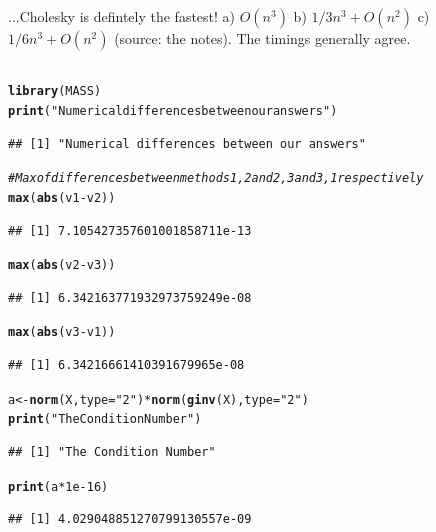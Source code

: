 \documentclass{article}\usepackage[]{graphicx}\usepackage[]{color}
\makeatletter
\newcommand{\hlnum}[1]{\textcolor[rgb]{0.686,0.059,0.569}{#1}}%
\newcommand{\hlstr}[1]{\textcolor[rgb]{0.192,0.494,0.8}{#1}}%
\newcommand{\hlcom}[1]{\textcolor[rgb]{0.678,0.584,0.686}{\textit{#1}}}%
\newcommand{\hlopt}[1]{\textcolor[rgb]{0,0,0}{#1}}%
\newcommand{\hlstd}[1]{\textcolor[rgb]{0.345,0.345,0.345}{#1}}%
\newcommand{\hlkwb}[1]{\textcolor[rgb]{0.69,0.353,0.396}{#1}}%
\newcommand{\hlkwc}[1]{\textcolor[rgb]{0.333,0.667,0.333}{#1}}%
\newcommand{\hlkwd}[1]{\textcolor[rgb]{0.737,0.353,0.396}{\textbf{#1}}}%
\newenvironment{kframe}{%
 \def\at@end@of@kframe{}%
 \ifinner\ifhmode%
  \def\at@end@of@kframe{\end{minipage}}%
  \begin{minipage}{\columnwidth}%
 \fi\fi%
 \def\FrameCommand##1{\hskip\@totalleftmargin \hskip-\fboxsep
 \colorbox{shadecolor}{##1}\hskip-\fboxsep
     \hskip-\linewidth \hskip-\@totalleftmargin \hskip\columnwidth}%
 \MakeFramed {\advance\hsize-\width
   \@totalleftmargin\z@ \linewidth\hsize
   \@setminipage}}%
 {\par\unskip\endMakeFramed%
 \at@end@of@kframe}
\newenvironment{knitrout}{}{} %
\makeatother
\begin{document}
...Cholesky is defintely the fastest!  a) \(O(n^3)\) b) \( 1/3 n^3 + O(n^2) \) c) \(1/6 n^3 + O(n^2) \)  (source: the notes).  The timings generally agree.

\subsection{}

\begin{knitrout}
\color{fgcolor}\begin{kframe}
\begin{alltt}
\hlkwd{library}\hlstd{(MASS)}
\hlkwd{print}\hlstd{(}\hlstr{"Numerical differences between our answers"}\hlstd{)}
\end{alltt}
\begin{verbatim}
## [1] "Numerical differences between our answers"
\end{verbatim}
\begin{alltt}
\hlcom{# Max of differences between methods 1, 2 and 2, 3 and 3, 1 respectively}
\hlkwd{max}\hlstd{(}\hlkwd{abs}\hlstd{(v1}\hlopt{-}\hlstd{v2))}
\end{alltt}
\begin{verbatim}
## [1] 7.105427357601001858711e-13
\end{verbatim}
\begin{alltt}
\hlkwd{max}\hlstd{(}\hlkwd{abs}\hlstd{(v2}\hlopt{-}\hlstd{v3))}
\end{alltt}
\begin{verbatim}
## [1] 6.342163771932973759249e-08
\end{verbatim}
\begin{alltt}
\hlkwd{max}\hlstd{(}\hlkwd{abs}\hlstd{(v3}\hlopt{-}\hlstd{v1))}
\end{alltt}
\begin{verbatim}
## [1] 6.34216661410391679965e-08
\end{verbatim}
\begin{alltt}
\hlstd{a} \hlkwb{<-} \hlkwd{norm}\hlstd{(X,}\hlkwc{type}\hlstd{=}\hlstr{"2"}\hlstd{)} \hlopt{*} \hlkwd{norm}\hlstd{(}\hlkwd{ginv}\hlstd{(X),}\hlkwc{type}\hlstd{=}\hlstr{"2"}\hlstd{)}
\hlkwd{print}\hlstd{(}\hlstr{"The Condition Number"}\hlstd{)}
\end{alltt}
\begin{verbatim}
## [1] "The Condition Number"
\end{verbatim}
\begin{alltt}
\hlkwd{print}\hlstd{(a} \hlopt{*} \hlnum{1e-16}\hlstd{)}
\end{alltt}
\begin{verbatim}
## [1] 4.029048851270799130557e-09
\end{verbatim}
\end{kframe}
\end{knitrout}
\end{document}
